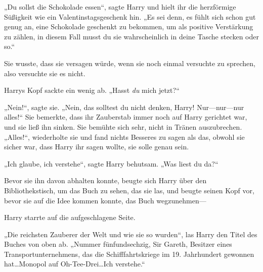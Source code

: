 „Du sollst die Schokolade essen“, sagte Harry und hielt ihr die herzförmige Süßigkeit wie ein Valentinstagsgeschenk hin. „Es sei denn, es fühlt sich schon gut genug an, eine Schokolade geschenkt zu bekommen, um als positive Verstärkung zu zählen, in diesem Fall musst du sie wahrscheinlich in deine Tasche stecken oder so.“

Sie wusste, dass sie versagen würde, wenn sie noch einmal versuchte zu sprechen, also versuchte sie es nicht.

Harrys Kopf sackte ein wenig ab. „Hasst \emph{du} mich jetzt?“

„Nein!“, sagte sie. „Nein, das solltest du nicht denken, Harry! Nur—nur—nur alles!“
Sie bemerkte, dass ihr Zauberstab immer noch auf Harry gerichtet war, und sie ließ ihn sinken. Sie bemühte sich sehr, nicht in Tränen auszubrechen.
„Alles!“, wiederholte sie und fand nichts Besseres zu sagen als das, obwohl sie sicher war, dass Harry ihr sagen wollte, sie solle genau sein.

„Ich glaube, ich verstehe“, sagte Harry behutsam. „Was liest du da?“

Bevor sie ihn davon abhalten konnte, beugte sich Harry über den Bibliothekstisch, um das Buch zu sehen, das sie las, und beugte seinen Kopf vor, bevor sie auf die Idee kommen konnte, das Buch wegzunehmen—

Harry starrte auf die aufgeschlagene Seite.

„Die reichsten Zauberer der Welt und wie sie so wurden“, las Harry den Titel des Buches von oben ab. „Nummer fünfundsechzig, Sir Gareth, Besitzer eines Transportunternehmens, das die Schifffahrtskriege im 19. Jahrhundert gewonnen hat…Monopol auf Oh-Tee-Drei…Ich verstehe.“

